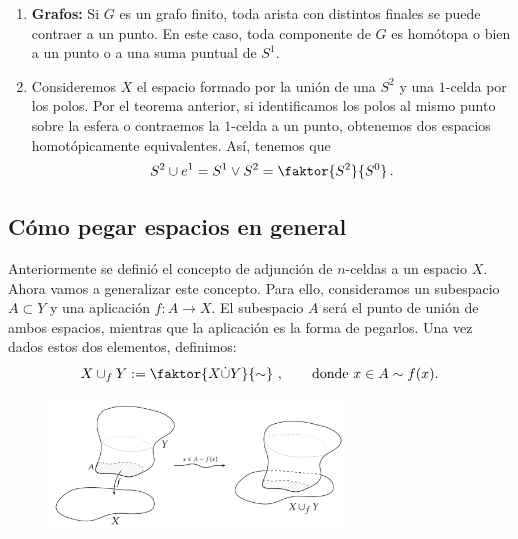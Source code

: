 \begin{ejems}
\begin{enumerate}
\item \textbf{Grafos:} 
Si $G$ es un grafo finito, toda arista con distintos finales se puede contraer a un punto. En este caso, toda componente de $G$ es homótopa o bien a un punto o a una suma puntual de $S^1$.

\item Consideremos $X$ el espacio formado por la unión de una $S^2$ y una $1$-celda por los polos. Por el teorema anterior, si identificamos los polos al mismo punto sobre la esfera o contraemos la $1$-celda a un punto, obtenemos dos espacios homotópicamente equivalentes. Así, tenemos que
\[ S^2 \cup e^1 = S^1 \vee S^2 = \faktor{S^2}{S^0} \,. \]

\end{enumerate}
\end{ejems}

\subsection{Cómo pegar espacios en general}
Anteriormente se definió el concepto de adjunción de $n$-celdas a un espacio $X$. Ahora vamos a generalizar este concepto. Para ello, consideramos un subespacio $A \subset Y $ y una aplicación $f : A \longrightarrow X$. El subespacio $A$ será el punto de unión de ambos espacios, mientras que la aplicación es la forma de pegarlos. Una vez dados estos dos elementos, definimos:
\[ X \cup_f Y := \faktor{X \dot{\cup} Y}{\sim} \ , \qquad \text{donde }x \in A \sim f(x). \]
\begin{figure}[h]
\centering
\includegraphics[width = 0.7\textwidth]{images/pegadoespacios}
\end{figure}


